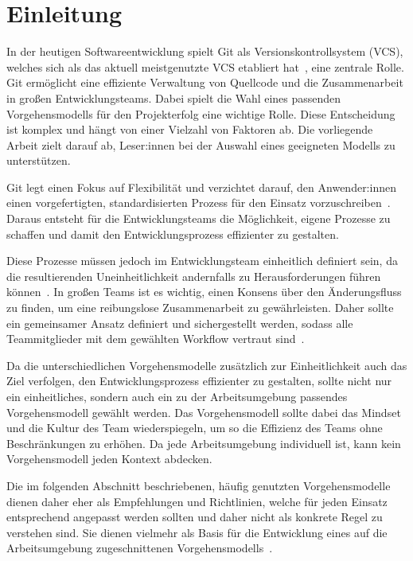 
\setcounter{page}{1}

\section{Einleitung}
\label{sec:einleitung}

In der heutigen Softwareentwicklung spielt Git als Versionskontrollsystem (VCS), welches sich als das aktuell meistgenutzte VCS etabliert hat~\cite{githubincGit2024,stackexchangeStackOverflowDeveloper}, eine zentrale Rolle. Git ermöglicht eine effiziente Verwaltung von Quellcode und die Zusammenarbeit in großen Entwicklungsteams. Dabei spielt die Wahl eines passenden Vorgehensmodells für den Projekterfolg eine wichtige Rolle. Diese Entscheidung ist komplex und hängt von einer Vielzahl von Faktoren ab. Die vorliegende Arbeit zielt darauf ab, Leser:innen bei der Auswahl eines geeigneten Modells zu unterstützen.

Git legt einen Fokus auf Flexibilität und verzichtet darauf, den Anwender:innen einen vorgefertigten, standardisierten Prozess für den Einsatz vorzuschreiben~\cite{atlassianComparingGitWorkflows2023}. Daraus entsteht für die Entwicklungsteams die Möglichkeit, eigene Prozesse zu schaffen und damit den Entwicklungsprozess effizienter zu gestalten. 

Diese Prozesse müssen jedoch im Entwicklungsteam einheitlich definiert sein, da die resultierenden Uneinheitlichkeit andernfalls zu Herausforderungen führen können~\cite{gitlabWhatGitWorkflow2023}. In großen Teams ist es wichtig, einen Konsens über den Änderungsfluss zu finden, um eine reibungslose Zusammenarbeit zu gewährleisten. Daher sollte ein gemeinsamer Ansatz definiert und sichergestellt werden, sodass alle Teammitglieder mit dem gewählten Workflow vertraut sind~\cite{atlassianComparingGitWorkflows2023}.

Da die unterschiedlichen Vorgehensmodelle zusätzlich zur Einheitlichkeit auch das Ziel verfolgen, den Entwicklungsprozess effizienter zu gestalten, sollte nicht nur ein einheitliches, sondern auch ein zu der Arbeitsumgebung passendes Vorgehensmodell gewählt werden. 
Das Vorgehensmodell sollte dabei das Mindset und die Kultur des Team wiederspiegeln, um so die Effizienz des Teams ohne Beschränkungen zu erhöhen. Da jede Arbeitsumgebung individuell ist, kann kein Vorgehensmodell jeden Kontext abdecken.

Die im folgenden Abschnitt beschriebenen, häufig genutzten Vorgehensmodelle dienen daher eher als Empfehlungen und Richtlinien, welche für jeden Einsatz entsprechend angepasst werden sollten und daher nicht als konkrete Regel zu verstehen sind. Sie dienen vielmehr als Basis für die Entwicklung eines auf die Arbeitsumgebung zugeschnittenen Vorgehensmodells~\cite{atlassianComparingGitWorkflows2023}.

